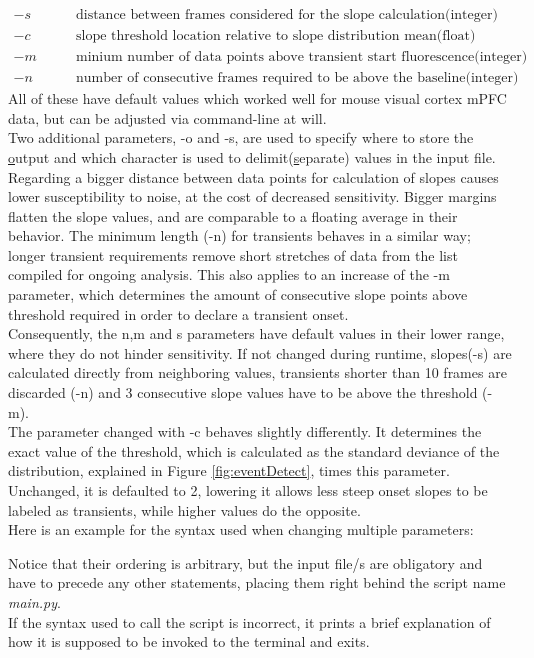 \documentclass[titlepage]{article}
\begin{document}
\begin{align*}
-s &\qquad\text{distance between frames considered for the slope calculation(integer)}\\
-c &\qquad\text{slope threshold location relative to slope distribution mean(float)}\\
-m &\qquad\text{minium number of data points above transient start fluorescence(integer)}\\
-n &\qquad\text{number of consecutive frames required to be above the baseline(integer)}
\end{align*}
All of these have default values which worked well for mouse visual cortex mPFC data, but can be adjusted via command-line at will. \\
Two additional parameters, -o and -s, are used to specify where to store the \underline{o}utput and which character is used to delimit(\underline{s}eparate) values in the input file.\\
Regarding a bigger distance between data points for calculation of slopes causes lower susceptibility to noise, at the cost of decreased sensitivity. Bigger margins flatten the slope values, and are comparable to a floating average in their behavior. The minimum length (-n) for transients behaves in a similar way; longer transient requirements remove short stretches of data from the list compiled for ongoing analysis. This also applies to an increase of the -m parameter, which determines the amount of consecutive slope points above threshold required in order to declare a transient onset.\\
Consequently, the n,m and s parameters have default values in their lower range, where they do not hinder sensitivity. If not changed during runtime, slopes(-s) are calculated directly from neighboring values, transients shorter than 10 frames are discarded (-n) and 3 consecutive slope values have to be above the threshold (-m).\\
The parameter changed with -c behaves slightly differently. It determines the exact value of the threshold, which is calculated as the standard deviance of the distribution, explained in Figure \ref{fig:eventDetect}, times this parameter. Unchanged, it is defaulted to 2, lowering it allows less steep onset slopes to be labeled as transients, while higher values do the opposite.\\
Here is an example for the syntax used when changing multiple parameters:
\begin{mdframed}[backgroundcolor=black] 
\color{green}{$>>$ python main.py InputFile -q 1500 -m 10 -n 5 -c 2 -s 3}
\end{mdframed}
Notice that their ordering is arbitrary, but the input file/s are obligatory and have to precede any other statements, placing them right behind the script name \emph{main.py}.\\
If the syntax used to call the script is incorrect, it prints a brief explanation of how it is supposed to be invoked to the terminal and exits.
\end{document}
